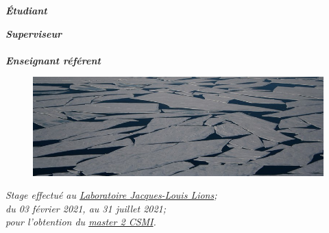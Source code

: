 \documentclass[ 
11pt, %
french, %
singlespacing, %
parskip, %
headsepline, %
openany, %
]{MastersDoctoralThesis} %
\renewcommand{\emph}[1]{\textbf{\textit{#1}}} %
\numberwithin{theorem}{section}  %
\begin{document}
\begin{titlepage}
\begin{center}
\begin{minipage}[t]{0.4\textwidth}
\begin{flushleft} \large
\vspace{7mm}
\emph{Étudiant}\\
\href{https://github.com/desmond-rn}{\authorname} %
\end{flushleft}
\end{minipage}
\begin{minipage}[t]{0.4\textwidth}
\begin{flushright} \large
\emph{Superviseur} \\
\href{https://www-ljk.imag.fr/membres/Stephane.Labbe/}{\supname} %
\\ \vspace{5mm}
\emph{Enseignant référent} \\
\href{http://www.feelpp.org/team/prudhomm/}{\examname} %
\end{flushright}
\end{minipage}%


\begin{figure}[H]
    \centering
    \includegraphics[width=.9\linewidth]{IntroPic2.jpg}
    \label{Fig:IntroPic}
\end{figure}



\large \textit{Stage effectué au \href{https://www.ljll.math.upmc.fr/?lang=fr}{Laboratoire Jacques-Louis Lions};}\\[0.2cm]
\textit{du 03 février 2021, au 31 juillet 2021;}\\[0.2cm]
\textit{pour l'obtention du \href{https://docs.google.com/document/d/10JbbXeqqu5J2BjMkSQRNQ8Gx7xBPOClLKpvd7EBZT8U/edit}{master 2 CSMI}. }\\[0.2cm]


\end{center}
\end{titlepage}
\end{document}
